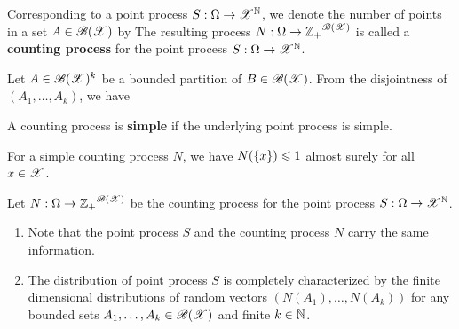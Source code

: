 \documentclass[letterpaper,10pt,english]{article}
\begin{document}
\begin{defn}
Corresponding to a point process $S:\Omega\to\mathscr{X}^{\mathbb{N}}$, 
we denote the number of points in a set $A \in \mathscr{B}(\mathscr{X})$ by
The resulting process $N: \Omega \to {\mathbb{Z}_+}^ {\mathscr{B}(\mathscr{X})}$ is called a \textbf{counting process} for the point process $S: \Omega \to \mathscr{X}^{\mathbb{N}}$. 
\end{defn} 
\begin{rem}
Let $A \in \mathscr{B}(\mathscr{X})^k$ be a bounded partition of $B\in \mathscr{B}(\mathscr{X})$. 
From the disjointness of $(A_1, \dots, A_k)$, we have 
\end{rem}
\begin{defn} 
A counting process is \textbf{simple} if the underlying point process is simple. %
\end{defn}
\begin{rem}
For a simple counting process $N$, we have $N(\left\{x\right\}) \leqslant 1$ almost surely for all $x \in \mathscr{X}$.
\end{rem}
\begin{rem}
Let $N : \Omega \to {\mathbb{Z}_+}^{\mathscr{B}(\mathscr{X})}$ be the counting process for the point process $S: \Omega \to \mathscr{X}^{\mathbb{N}}$.  
\begin{enumerate}[i\_]
\item Note that the point process $S$ and the counting process $N$ carry the same information. 
\item The distribution of point process $S$ is completely characterized by the finite dimensional distributions of random vectors $(N(A_1), \dots, N(A_k))$ for any bounded sets $A_1, \dots, A_k \in \mathscr{B}(\mathscr{X})$ and finite $k \in \mathbb{N}$.  
\end{enumerate}
\end{rem}
\end{document}
